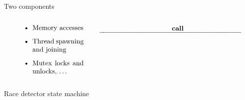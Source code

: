 \begin{frame}{Two components}
  \begin{columns}
    \begin{column}{0.1\textwidth}

    \end{column}
    \begin{column}{0.33\textwidth}
      \begin{equation*}
        \left.
        \begin{minipage}[c]{3.5cm}
          \begin{itemize}
            \item Memory accesses
            \item Thread spawning and joining
            \item Mutex locks and unlocks, \dots
          \end{itemize}
        \end{minipage}
        \quad\right\}
      \end{equation*}
    \end{column}
    \begin{column}{0.25\textwidth}
      \phantom{invisible text}

      \smallskip
        $\xrightarrow{\hspace{0.3\textwidth}\text{\normalsize\textbf{call}}\hspace{0.3\textwidth}}$
    \end{column}
    \begin{column}{0.42\textwidth}
      \phantom{invisible text}

      \medskip
    \end{column}
  \end{columns}
\end{frame}

\newcommand\stateMachineDiagram[1]{
  \providecommand\step{#1}
}

\begin{frame}{Race detector state machine}
  \centering
  \only<1>{\stateMachineDiagram{2}}
  \only<2>{\stateMachineDiagram{3}}
  \only<3>{\stateMachineDiagram{4}}
\end{frame}

\begin{frame}{}
  \begin{columns}
    \begin{column}{0.3\textwidth}
    \end{column}
  \end{columns}
\end{frame}

